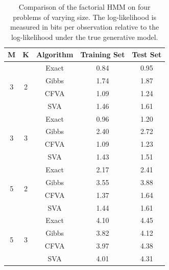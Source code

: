 \documentclass[10pt,a4paper]{report}
\begin{document}
\begin{table}[h]
\centering
\begin{tabular}{cclll}
\hline
\ttfamily M & \ttfamily K & \ttfamily Algorithm & \ttfamily Training Set & \ttfamily Test Set \\
\hline
\multirow{4}{*}{3}  & \multirow{4}{*}{2} 
& \multicolumn{1}{c}{Exact} & \multicolumn{1}{c}{0.84}  & \multicolumn{1}{c}{0.95}
\\ \cline{3-5}
&	 & \multicolumn{1}{c}{Gibbs} & \multicolumn{1}{c}{1.74} & \multicolumn{1}{c}{1.87}
\\ \cline{3-5}
&   & \multicolumn{1}{c}{CFVA} & \multicolumn{1}{c}{1.09} & \multicolumn{1}{c}{1.24} 
\\ \cline{3-5}
&    & \multicolumn{1}{c}{SVA} & \multicolumn{1}{c}{1.46} & \multicolumn{1}{c}{1.61} \\ 
\hline
  \multirow{4}{*}{3}  & \multirow{4}{*}{3} 
& \multicolumn{1}{c}{Exact} & \multicolumn{1}{c}{0.96}  & \multicolumn{1}{c}{1.20}
\\ \cline{3-5}
&	 & \multicolumn{1}{c}{Gibbs} & \multicolumn{1}{c}{2.40} & \multicolumn{1}{c}{2.72}
\\ \cline{3-5}
&   & \multicolumn{1}{c}{CFVA} & \multicolumn{1}{c}{1.09} & \multicolumn{1}{c}{1.23} 
\\ \cline{3-5}
&    & \multicolumn{1}{c}{SVA} & \multicolumn{1}{c}{1.43} & \multicolumn{1}{c}{1.51} \\ 
\hline
\multirow{4}{*}{5}  & \multirow{4}{*}{2} 
& \multicolumn{1}{c}{Exact} & \multicolumn{1}{c}{2.17}  & \multicolumn{1}{c}{2.41}
\\ \cline{3-5}
&	 & \multicolumn{1}{c}{Gibbs} & \multicolumn{1}{c}{3.55} & \multicolumn{1}{c}{3.88}
\\ \cline{3-5}
&   & \multicolumn{1}{c}{CFVA} & \multicolumn{1}{c}{1.37} & \multicolumn{1}{c}{1.64} 
\\ \cline{3-5}
&    & \multicolumn{1}{c}{SVA} & \multicolumn{1}{c}{1.44} & \multicolumn{1}{c}{1.61} \\ 
\hline
\multirow{4}{*}{5}  & \multirow{4}{*}{3} 
& \multicolumn{1}{c}{Exact} & \multicolumn{1}{c}{4.10}  & \multicolumn{1}{c}{4.45}
\\ \cline{3-5}
&	 & \multicolumn{1}{c}{Gibbs} & \multicolumn{1}{c}{3.82} & \multicolumn{1}{c}{4.12}
\\ \cline{3-5}
&   & \multicolumn{1}{c}{CFVA} & \multicolumn{1}{c}{3.97} & \multicolumn{1}{c}{4.38} 
\\ \cline{3-5}
&    & \multicolumn{1}{c}{SVA} & \multicolumn{1}{c}{4.01} & \multicolumn{1}{c}{4.31} \\  
\hline 
\end{tabular}
\caption{Comparison of the factorial HMM on four problems of varying size. The log-likelihood is measured in bits per observation relative to the log-likelihood under the true generative model.}
\label{tab:xxx}
\end{table}
\end{document}
